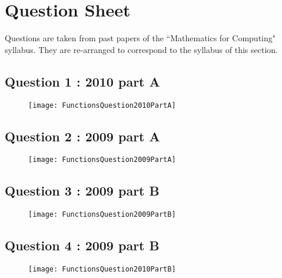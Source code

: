 \section*{Question Sheet}
Questions are taken from past papers of the ``Mathematics for Computing" syllabus.  They are re-arranged to correspond to the syllabus of this section.


\newpage
\subsection*{Question 1 : 2010 part A}
\begin{figure}[h!]
	\centering
	\texttt{[image: FunctionsQuestion2010PartA]}
	
\end{figure}


\newpage
\subsection*{Question 2 : 2009 part A}
\begin{figure}[h!]
\centering
\texttt{[image: FunctionsQuestion2009PartA]}
\end{figure}


\newpage
\subsection*{Question 3 : 2009 part B}
\begin{figure}[h!]
	\centering
	\texttt{[image: FunctionsQuestion2009PartB]}
	
\end{figure}

\newpage
\subsection*{Question 4 : 2009 part B}
\begin{figure}[h!]
	\centering
	\texttt{[image: FunctionsQuestion2010PartB]}
	
\end{figure}

